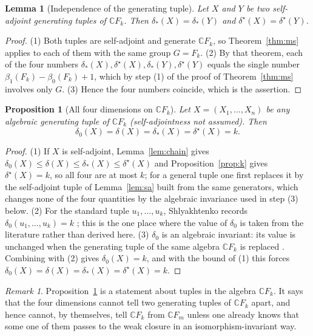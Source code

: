 \documentclass[11pt]{article}
\theoremstyle{plain}
\newtheorem{lemma}[theorem]{Lemma}
\newtheorem{proposition}[theorem]{Proposition}
\theoremstyle{definition}
\theoremstyle{remark}
\newtheorem{remark}[theorem]{Remark}
\newcommand{\C}{\mathbb{C}}\newcommand{\N}{\mathbb{N}}
\begin{document}
\begin{lemma}[Independence of the generating tuple]\label{lem:invar}
Let $X$ and $Y$ be two self-adjoint generating tuples of $\C F_k$. Then $\delta_*(X)=\delta_*(Y)$ and $\delta^\star(X)=\delta^\star(Y)$.
\end{lemma}

\begin{proof}
(1) Both tuples are self-adjoint and generate $\C F_k$, so Theorem~\ref{thm:ms} applies to each of them with the same group $G=F_k$.
(2) By that theorem, each of the four numbers $\delta_*(X),\delta^\star(X),\delta_*(Y),\delta^\star(Y)$ equals the single number $\beta_1(F_k)-\beta_0(F_k)+1$, which by step (1) of the proof of Theorem~\ref{thm:ms} involves only $G$.
(3) Hence the four numbers coincide, which is the assertion.
\end{proof}

\begin{proposition}[All four dimensions on $\C F_k$]\label{prop:allfour}
Let $X=(X_1,\dots,X_n)$ be any algebraic generating tuple of $\C F_k$ (self-adjointness not assumed). Then
\[
\delta_0(X)=\delta(X)=\delta_*(X)=\delta^\star(X)=k .
\]
\end{proposition}

\begin{proof}
(1) If $X$ is self-adjoint, Lemma~\ref{lem:chain} gives $\delta_0(X)\le\delta(X)\le\delta_*(X)\le\delta^\star(X)$ and Proposition~\ref{prop:k} gives $\delta^\star(X)=k$, so all four are at most $k$; for a general tuple one first replaces it by the self-adjoint tuple of Lemma~\ref{lem:sa} built from the same generators, which changes none of the four quantities by the algebraic invariance used in step (3) below.
(2) For the standard tuple $u_1,\dots,u_k$, Shlyakhtenko records $\delta_0(u_1,\dots,u_k)=k$ \cite[Lemma 6]{Sh06}; this is the one place where the value of $\delta_0$ is taken from the literature rather than derived here.
(3) $\delta_0$ is an algebraic invariant: its value is unchanged when the generating tuple of the same algebra $\C F_k$ is replaced \cite[Lemma 6]{Sh06}. Combining with (2) gives $\delta_0(X)=k$, and with the bound of (1) this forces $\delta_0(X)=\delta(X)=\delta_*(X)=\delta^\star(X)=k$.
\end{proof}

\begin{remark}
Proposition~\ref{prop:allfour} is a statement about tuples in the algebra $\C F_k$. It says that the four dimensions cannot tell two generating tuples of $\C F_k$ apart, and hence cannot, by themselves, tell $\C F_k$ from $\C F_m$ unless one already knows that some one of them passes to the weak closure in an isomorphism-invariant way.
\end{remark}
\end{document}
